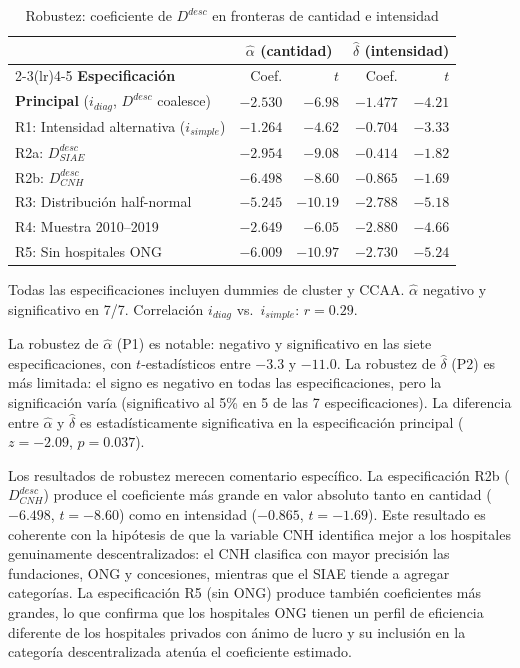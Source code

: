 \documentclass[12pt, a4paper, twoside, openright]{book}
\theoremstyle{plain}
\theoremstyle{definition}
\theoremstyle{remark}
\begin{document}
\begin{table}[htbp]
\centering
\caption{Robustez: coeficiente de $D^{desc}$ en fronteras de cantidad e intensidad}
\label{tab:robustez}
\begin{threeparttable}
\begin{tabular}{lrrrr}
\toprule
& \multicolumn{2}{c}{\textbf{$\hat{\alpha}$ (cantidad)}}
& \multicolumn{2}{c}{\textbf{$\hat{\delta}$ (intensidad)}} \\
\cmidrule(lr){2-3}\cmidrule(lr){4-5}
\textbf{Especificación} & Coef. & $t$ & Coef. & $t$ \\
\midrule
\textbf{Principal} ($i_{diag}$, $D^{desc}$ coalesce)
  & $-2.530$ & $-6.98$ & $-1.477$ & $-4.21$ \\[3pt]
R1: Intensidad alternativa ($i_{simple}$)
  & $-1.264$ & $-4.62$ & $-0.704$ & $-3.33$ \\
R2a: $D^{desc}_{SIAE}$
  & $-2.954$ & $-9.08$ & $-0.414$ & $-1.82$ \\
R2b: $D^{desc}_{CNH}$
  & $-6.498$ & $-8.60$ & $-0.865$ & $-1.69$ \\
R3: Distribución half-normal
  & $-5.245$ & $-10.19$ & $-2.788$ & $-5.18$ \\
R4: Muestra 2010--2019
  & $-2.649$ & $-6.05$ & $-2.880$ & $-4.66$ \\
R5: Sin hospitales ONG
  & $-6.009$ & $-10.97$ & $-2.730$ & $-5.24$ \\
\bottomrule
\end{tabular}
\begin{tablenotes}
  \small
  \item Todas las especificaciones incluyen dummies de cluster y CCAA. $\hat{\alpha}$ negativo y significativo en 7/7. Correlación $i_{diag}$ vs.\ $i_{simple}$: $r=0.29$.
\end{tablenotes}
\end{threeparttable}
\end{table}

La robustez de $\hat{\alpha}$ (P1) es notable: negativo y significativo en las siete especificaciones, con $t$-estadísticos entre $-3.3$ y $-11.0$. La robustez de $\hat{\delta}$ (P2) es más limitada: el signo es negativo en todas las especificaciones, pero la significación varía (significativo al 5\% en 5 de las 7 especificaciones). La diferencia entre $\hat{\alpha}$ y $\hat{\delta}$ es estadísticamente significativa en la especificación principal ($z=-2.09$, $p=0.037$).

Los resultados de robustez merecen comentario específico. La especificación R2b ($D^{desc}_{CNH}$) produce el coeficiente más grande en valor absoluto tanto en cantidad ($-6.498$, $t=-8.60$) como en intensidad ($-0.865$, $t=-1.69$). Este resultado es coherente con la hipótesis de que la variable CNH identifica mejor a los hospitales genuinamente descentralizados: el CNH clasifica con mayor precisión las fundaciones, ONG y concesiones, mientras que el SIAE tiende a agregar categorías. La especificación R5 (sin ONG) produce también coeficientes más grandes, lo que confirma que los hospitales ONG tienen un perfil de eficiencia diferente de los hospitales privados con ánimo de lucro y su inclusión en la categoría descentralizada atenúa el coeficiente estimado.
\end{document}
